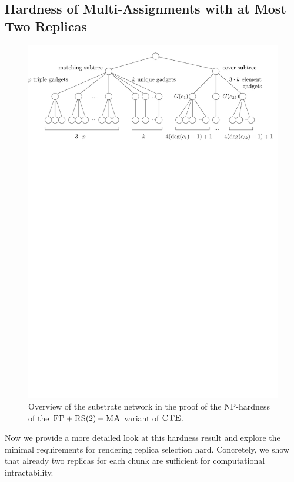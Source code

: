 \pagebreak

\subsection{Hardness of Multi-Assignments with at Most Two Replicas}
\begin{figure}[t]
  \centering
  \includegraphics[width=0.9\columnwidth]{figs/static-mapping/overview}
  \caption{Overview of the substrate network in the proof of the NP-hardness of the $\textsc{FP}+\textsc{RS}(2)+\textsc{MA}$ variant of $\textsc{CTE}$.}
  \label{fig:red-ma2}
\end{figure}


Now we provide a more detailed look at this hardness result
and explore the minimal requirements for rendering replica selection hard.
Concretely, we show that already two replicas for each chunk are sufficient for computational intractability.

